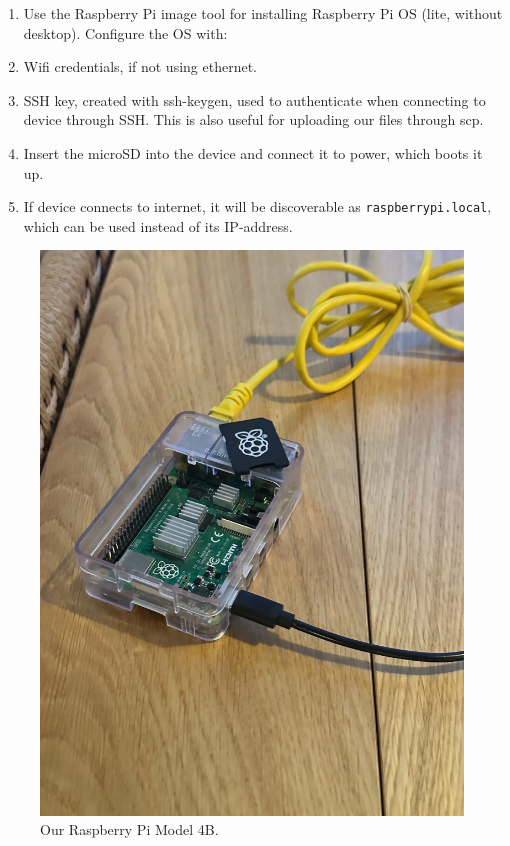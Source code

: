 \documentclass[
  table]{report}
\providecommand{\tightlist}{%
  \setlength{\itemsep}{0pt}\setlength{\parskip}{0pt}}
\begin{document}
\begin{enumerate}
\def\labelenumi{\arabic{enumi}.}
\tightlist
\item
  Use the Raspberry Pi image tool for installing Raspberry Pi OS (lite,
  without desktop). Configure the OS with:
\item
  Wifi credentials, if not using ethernet.
\item
  SSH key, created with ssh-keygen, used to authenticate when connecting
  to device through SSH. This is also useful for uploading our files
  through scp.
\item
  Insert the microSD into the device and connect it to power, which
  boots it up.
\item
  If device connects to internet, it will be discoverable as
  \texttt{raspberrypi.local}, which can be used instead of its
  IP-address.
\end{enumerate}

\begin{figure}[H]
\centering
  \includegraphics{assets/raspberry-setup.jpeg}
  \caption{Our Raspberry Pi Model 4B.}
  \label{fig:rpi_setup}
\end{figure}
\end{document}
